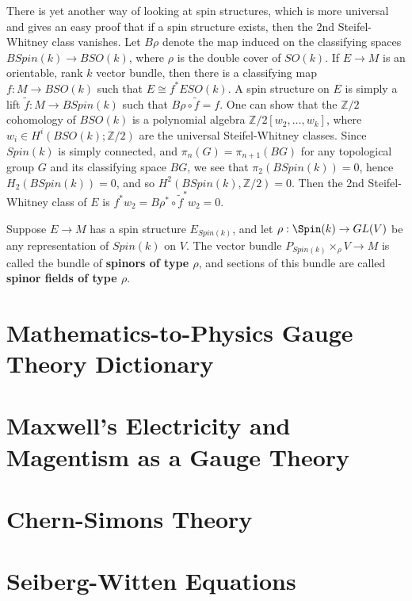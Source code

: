 There is yet another way of looking at spin structures, which is more universal and gives an easy proof that if a spin structure exists, then the 2nd Steifel-Whitney class vanishes. Let $B\rho$ denote the map induced on the classifying spaces $BSpin(k) \rightarrow BSO(k)$, where $\rho$ is the double cover of $SO(k)$. If $E \rightarrow M$ is an orientable, rank $k$ vector bundle, then there is a classifying map $f : M \rightarrow BSO(k)$ such that $E \cong f^* ESO(k)$. A spin structure on $E$ is simply a lift $\tilde f : M \rightarrow BSpin(k)$ such that $B\rho \circ \tilde f = f$. One can show that the $\mathbb Z/2$ cohomology of $BSO(k)$ is a polynomial algebra $\mathbb Z/2[w_2,\ldots,w_k]$, where $w_i \in H^i(BSO(k);\mathbb Z/2)$ are the universal Steifel-Whitney classes. Since $Spin(k)$ is simply connected, and $\pi_n(G)=\pi_{n+1}(BG)$ for any topological group $G$ and its classifying space $BG$, we see that $\pi_2(BSpin(k))=0$, hence $H_2(BSpin(k))=0$, and so $H^2(BSpin(k),\mathbb Z/2) = 0$. Then the 2nd Steifel-Whitney class of $E$ is $f^*w_2 = B\rho^* \circ \tilde f^*w_2 = 0$.

Suppose $E \rightarrow M$ has a spin structure $E_{Spin(k)}$, and let $\rho : \Spin(k) \rightarrow GL(V)$ be any representation of $Spin(k)$ on $V$. The vector bundle $P_{Spin(k)} \times_\rho V \rightarrow M$ is called the bundle of \textbf{spinors of type $\rho$}, and sections of this bundle are called \textbf{spinor fields of type $\rho$}.













\section{Mathematics-to-Physics Gauge Theory Dictionary}






\section{Maxwell's Electricity and Magentism as a Gauge Theory}








\section{Chern-Simons Theory}




\section{Seiberg-Witten Equations}























